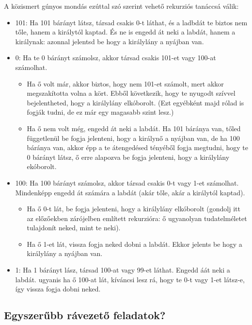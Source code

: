 \documentclass{article}
\begin{document}
	A közismert gúnyos mondás ezúttal szó szerint vehető rekurziós tanáccsá válik:

	\begin{itemize}
		\item 101: Ha 101 bárányt látsz, társad csakis 0-t láthat, és a ladbdát te biztos nem tőle, hanem a királytól kaptad. És ne is engedd át neki a labdát, hanem a királynak: azonnal jelentsd be hogy a királylány a nyájban van.
		\item 0: Ha  te 0 bárányt számolsz, akkor társad csakis 101-et vagy 100-at számolhat.
		\begin{itemize}
			\item Ha ő volt már, akkor biztos, hogy nem 101-et számolt, mert akkor megszakította volna a kört. Ebből következik, hogy te nyugodt szívvel bejelentheted, hogy a királylány elkóborolt. (Ezt egyébként majd rólad is  fogják tudni, de ez már egy magasabb szint lesz.)
			\item Ha ő nem volt még, engedd át neki a labdát. Ha 101 báránya van, tőled függetlenül be fogja jelenteni, hogy a királynő a nyájban van, de ha 100 báránya van, akkor  épp a te átengedésed tényéből fogja megtudni, hogy te 0 bárányt látsz, ő erre alapozva be fogja jelenteni, hogy a királylány ekóborolt.
		\end{itemize}
		\item 100: Ha 100 bárányt számolsz, akkor társad csakis 0-t vagy 1-et számolhat. Mindenképp engedd át számára a labdát (akár tőle, akár a királytól kaptad).
		\begin{itemize}
			\item Ha ő 0-t lát, be fogja jelenteni, hogy a királylány elkóborolt (gondolj itt az előzőekben zárójelben említett rekurzióra: ő ugyanolyan tudatelméletet tulajdonít neked, mint te neki).
			\item Ha ő 1-et lát, vissza fogja neked dobni a labdát. Ekkor jelents be hogy a királylány a nyájban van.
		\end{itemize}
		\item 1: Ha 1 bárányt lász, társad 100-at vagy 99-et láthat. Engedd áát neki a labdát. ugyanis ha ő 100-at lát, kíváncsi lesz rá, hogy te 0-t vagy 1-et látsz-e, így vissza fogja dobni neked.
	\end{itemize}

	\subsection{Egyszerűbb rávezető feladatok?}
\end{document}
